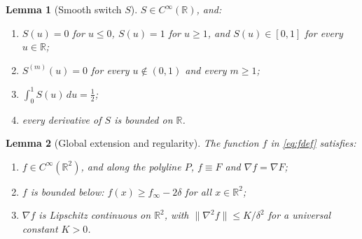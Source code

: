 \documentclass[10pt,a4paper]{amsart}
\newtheorem{lemma}{Lemma}
\newcommand{\R}{\mathbb{R}}
\begin{document}
\begin{lemma}[Smooth switch $S$]
\label{lem:S}
$S\in C^\infty(\R)$, and:
\begin{enumerate}
\item[(i)] $S(u)=0$ for $u\le0$, $S(u)=1$ for $u\ge1$, and $S(u)\in[0,1]$ for every $u\in\R$;
\item[(ii)] $S^{(m)}(u)=0$ for every $u\notin(0,1)$ and every $m\ge1$;
\item[(iii)] $\int_0^1S(u)\,du=\tfrac12$;
\item[(iv)] every derivative of $S$ is bounded on $\R$.
\end{enumerate}
\end{lemma}

\begin{lemma}[Global extension and regularity]
\label{lem:global}
The function $f$ in \eqref{eq:fdef} satisfies:
\begin{enumerate}
\item[(i)] $f\in C^\infty(\R^2)$, and along the polyline $P$, $f\equiv F$ and $\nabla f=\nabla F$;
\item[(ii)] $f$ is bounded below: $f(x)\ge f_\infty-2\delta$ for all $x\in\R^2$;
\item[(iii)] $\nabla f$ is Lipschitz continuous on $\R^2$, with $\|\nabla^2f\|\le K/\delta^2$ for a universal constant $K > 0$.
\end{enumerate}
\end{lemma}
\end{document}
